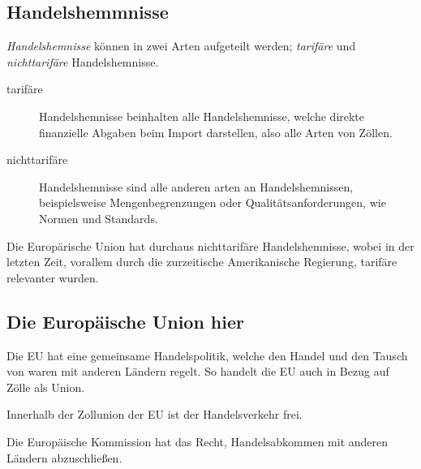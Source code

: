 \documentclass{article}
\begin{document}
\subsection{Handelshemmnisse}
\emph{Handelshemnisse} können in zwei Arten aufgeteilt werden; \emph{tarifäre} und \emph{nichttarifäre} Handelshemnisse.
\begin{description}
 \item[tarifäre] Handelshemnisse beinhalten alle Handelshemnisse, welche direkte finanzielle Abgaben beim Import darstellen, also alle Arten von Zöllen.
 \item[nichttarifäre] Handelshemnisse sind alle anderen arten an Handelshemnissen, beispielsweise Mengenbegrenzungen oder Qualitätsanforderungen, wie Normen und Standards.
\end{description}
Die Europärische Union hat durchaus nichttarifäre Handelshemnisse, wobei in der letzten Zeit, vorallem durch die zurzeitische Amerikanische Regierung, tarifäre relevanter wurden.
 
\subsection{Die Europäische Union hier}
Die EU hat eine gemeinsame Handelspolitik, welche den Handel und den Tausch von waren mit anderen Ländern regelt. So handelt die EU auch in Bezug auf Zölle als Union.
 
Innerhalb der Zollunion der EU ist der Handelsverkehr frei.
 
Die Europäische Kommission hat das Recht, Handelsabkommen mit anderen Ländern abzuschließen. 
\end{document}
